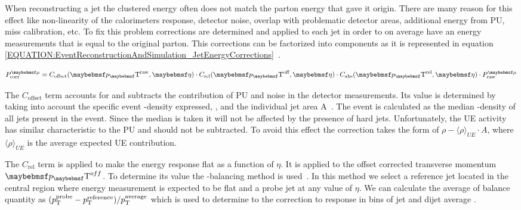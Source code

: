 
When reconstructing a jet the clustered energy often does not match the parton energy that gave it origin. There are many reason for this effect like non-linearity of the calorimeters response, detector noise, overlap with problematic detector areas, additional energy from \gls{PU}, miss calibration, etc. To fix this problem corrections are determined and applied to each jet in order to on average have an energy measurements that is equal to the original parton. This corrections can be factorized into components as it is represented in equation \ref{EQUATION:EventReconstructionAndSimulation_JetEnergyCorrections}~\cite{ARTICLE:CMSDeterminationJetEnergyCalibration}.

\begin{equation}
P_{\text{corr}}^{\mu} = C_{\text{offset}}(\pT^{\text{raw}},\eta) \cdot C_{\text{rel}}(\pT^{\text{off}},\eta) \cdot C_{\text{abs}}(\pT^{\text{rel}},\eta) \cdot P_{\text{raw}}^{\mu}
\label{EQUATION:EventReconstructionAndSimulation_JetEnergyCorrections}
\end{equation}

The $C_{\text{offset}}$ term accounts for and subtracts the contribution of \gls{PU} and noise in the detector measurements. Its value is determined by taking into account the specific event \pt-density expressed, \rho, and the individual jet area A~\cite{ARTICLE:PileupSubtractionJetAreas}. The event \rho is calculated as the median \pt-density of all jets present in the event. Since the median is taken it will not be affected by the presence of hard jets. Unfortunately, the \gls{UE} activity has similar characteristic to the \gls{PU} and should not be subtracted. To avoid this effect the correction takes the form of $\rho - \langle \rho \rangle_{UE} \cdot A$, where $\langle \rho \rangle_{UE}$ is the average expected \gls{UE} contribution.

The $C_{\text{rel}}$ term is applied to make the energy response flat as a function of $\eta$. It is applied to the offset corrected transverse momentum $\pT^{off}$. To determine its value the \pt-balancing method is used~\cite{ARTICLE:CMSDeterminationJetEnergyCalibration}. In this method we select a reference jet located in the central region where energy measurement is expected to be flat and a probe jet at any value of $\eta$. We can calculate the average of balance quantity as $(p_{\mathrm{T}}^{\text{probe}} - p_{\mathrm{T}}^{\text{reference}} ) / p_{\mathrm{T}}^{\text{average}}$ which is used to determine to the correction to response in bins of jet \eta and dijet average \pt. 

